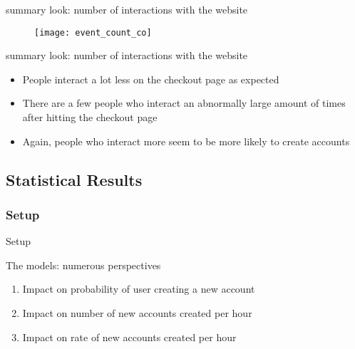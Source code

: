 \documentclass{beamer}
\begin{document}
		\begin{frame}{summary look: number of interactions with the website}
			\begin{figure}[H]
				\centering
				\texttt{[image: event\_count\_co]}
			\end{figure}
			
		\end{frame}
		
		\begin{frame}{summary look: number of interactions with the website}
			\begin{itemize}
				\item People interact a lot less on the checkout page as expected
				\item There are a few people who interact an abnormally large amount of times after hitting the checkout page
				\item Again, people who interact more seem to be more likely to create accounts
			\end{itemize}
		\end{frame}
		
		
		\subsection{Statistical Results}
			\subsubsection{Setup}
			\begin{frame}{Setup}
				\begin{block}{The models: numerous perspectives}
					\begin{enumerate}
						\item Impact on probability of user creating a new account 
						\item Impact on number of new accounts created per hour
						\item Impact on rate of new accounts created per hour
					\end{enumerate}
				\end{block}		
			\end{frame}
			
\end{document}

